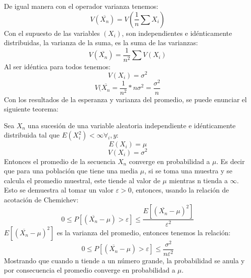 \documentclass{rbf}
\begin{document}
De igual manera con el operador varianza tenemos:
\begin{equation}
    V(\overline{X_n})=V(\frac{1}{n} \sum X_i)
\end{equation}
Con el supuesto de las variables $(X_i )$, son independientes e idénticamente distribuidas, la varianza de la suma, es la suma de las varianzas:
\begin{equation}
    V(\overline{X_n})=\frac{1}{n^2} \sum V(X_i)
\end{equation}
Al ser idéntica para todos tenemos:
\begin{equation}
    V({X_i})=\sigma^2
\end{equation}
\begin{equation}
    V(\overline{X_n}=\frac{1}{n^2} *n\sigma^2 =\frac{\sigma^2}{n}
\end{equation}
Con los resultados de la esperanza y varianza del promedio, se puede enunciar el siguiente teorema: 

Sea $X_n$ una sucesión de una variable aleatoria independiente e idénticamente distribuida tal que $E(X_i^2 )<\infty  \forall_i ,y:$
\begin{equation}
    E({X_i})=\mu
\end{equation}
\begin{equation}
    V({X_i})=\sigma^2
\end{equation}
Entonces el promedio de la secuencia $X_n$ converge en probabilidad a $\mu$. Es decir que para una población que tiene una media $\mu$, si se toma una muestra y se calcula el promedio muestral, este tiende al valor de $\mu$ mientras n tienda a $\infty$. 
Esto se demuestra al tomar un valor $\varepsilon> 0$, entonces, usando la relación de acotación de Chemichev:
\begin{equation}
    0\leq P[(\overline{X_n}-\mu)>\varepsilon] \leq \frac{E[(\overline{X_n}-\mu)^2]}{\varepsilon^2}
\end{equation}
$E[(\overline{X_n}-\mu)^2]$ es la varianza del promedio, entonces tenemos la relación:
\begin{equation}
    0\leq P[(\overline{X_n}-\mu)>\varepsilon] \leq \frac{\sigma^2}{n\varepsilon^2}
\end{equation}
Mostrando que cuando n tiende a un número grande, la probabilidad se anula y por consecuencia el promedio converge en probabilidad a $\mu$.
\end{document}
